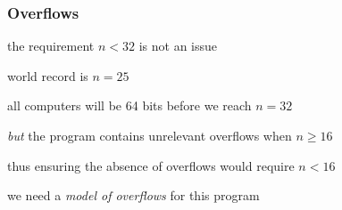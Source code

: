 \documentclass[compress]{beamer}
\begin{document}
\begin{frame}
  \frametitle{Overflows}
  the requirement $n<32$ is not an issue

  world record is $n=25$ 

  all computers will be 64 bits before we reach $n=32$

  \Pause
  \emph{but} the program contains unrelevant overflows when $n\ge 16$

  thus ensuring the absence of overflows would require $n<16$

  we need a \emph{model of overflows} for this program
\end{frame}
\end{document}
